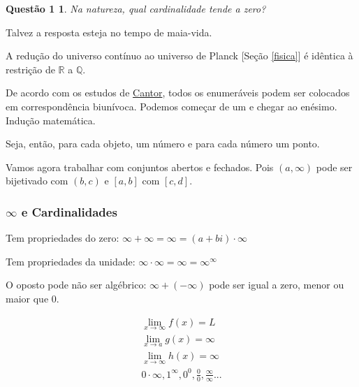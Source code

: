 \documentclass[12pt,a4paper]{article}
\begin{document}
				\theoremstyle{meuEstilo}

				\newtheorem{Q1}{Quest\~ao 1}
				\begin{Q1} Na natureza, qual cardinalidade tende a zero?
				\end{Q1}

				Talvez a resposta esteja no tempo \cite{tempo} de maia-vida.

				A redu\c{c}\~ao do universo cont\'inuo ao universo de Planck [Se\c{c}\~ao \ref{fisica}] \'e id\^entica \`a restri\c{c}\~ao de $ \mathbb{R} $ a $ \mathbb{Q} $.

				De acordo com os estudos de \href{http://en.wikipedia.org/wiki/Cardinality_of_the_continuum}{Cantor}, todos os enumer\'aveis podem ser colocados em correspond\^encia biun\'ivoca.
				Podemos come\c{c}ar de um e chegar ao en\'esimo. Indu\c{c}\~ao matem\'atica.

				Seja, ent\~ao, para cada objeto, um n\'umero e para cada n\'umero um ponto.

				Vamos agora trabalhar com conjuntos abertos e fechados. Pois $(a, \infty)$ pode ser bijetivado com $(b, c)$ e $[a,b]$ com $[c,d]$.

			\subsubsection{$ \infty $ e Cardinalidades}
			\begin{flushright}
			\end{flushright}

				Tem propriedades do zero: $ \infty + \infty = \infty = (a + bi) \cdot \infty $

				Tem propriedades da unidade: $ \infty \cdot \infty = \infty = \infty ^ \infty $

				O oposto pode n\~ao ser alg\'ebrico: $ \infty + (- \infty )$ pode ser igual a zero, menor ou maior que $0$.

				\begin{align*}
					\underset{x \rightarrow \infty}{\operatorname{\lim}} f(x) = L \\
					\underset{x \rightarrow a}{\operatorname{\lim}} g(x) = \infty \\
					\underset{x \rightarrow \infty}{\operatorname{\lim}} h(x) = \infty \\
					0 \cdot \infty, 1^ \infty, 0^0, \frac{0}{0}, \frac{\infty}{\infty}...
				\end{align*}
\end{document}
